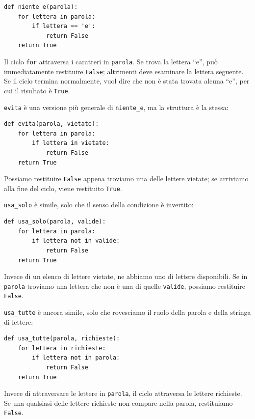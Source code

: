 \documentclass[10pt]{book}
\begin{document}
\begin{verbatim}
def niente_e(parola):
    for lettera in parola:
        if lettera == 'e':
            return False
    return True
\end{verbatim}
%
Il ciclo {\tt for} attraversa i caratteri in {\tt parola}.  Se trova la lettera  ``e'', può immediatamente restituire {\tt False}; altrimenti deve esaminare la lettera seguente. Se il ciclo termina normalmente, vuol dire che non è stata trovata alcuna ``e'', per cui il risultato è {\tt True}.



{\tt evita} è una versione più generale di \verb"niente_e", ma la struttura è la stessa:

\begin{verbatim}
def evita(parola, vietate):
    for lettera in parola:
        if lettera in vietate:
            return False
    return True
\end{verbatim}
%
Possiamo restituire {\tt False} appena troviamo una delle lettere vietate; se arriviamo alla fine del ciclo, viene restituito {\tt True}.

\verb"usa_solo" è simile, solo che il senso della condizione è invertito:

\begin{verbatim}
def usa_solo(parola, valide):
    for lettera in parola: 
        if lettera not in valide:
            return False
    return True
\end{verbatim}
%
Invece di un elenco di lettere vietate, ne abbiamo uno di lettere disponibili. Se in {\tt parola} troviamo una lettera che non è una di quelle {\tt valide}, possiamo restituire {\tt False}.

\verb"usa_tutte" è ancora simile, solo che rovesciamo il ruolo della parola e della stringa di lettere:

\begin{verbatim}
def usa_tutte(parola, richieste):
    for lettera in richieste: 
        if lettera not in parola:
            return False
    return True
\end{verbatim}
%
Invece di attraversare le lettere in {\tt parola}, il ciclo attraversa le lettere richieste. Se una qualsiasi delle lettere richieste non compare nella parola, restituiamo {\tt False}.
\end{document}
